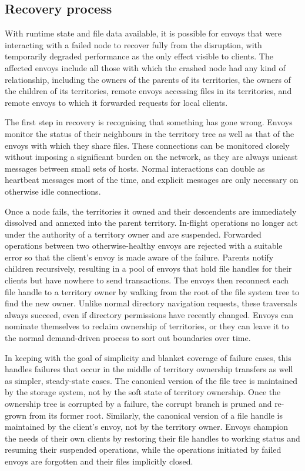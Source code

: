 \subsection{Recovery process}

With runtime state and file data available, it is possible for envoys that were interacting with a failed node to recover fully from the disruption, with temporarily degraded performance as the only effect visible to clients. The affected envoys include all those with which the crashed node had any kind of relationship, including the owners of the parents of its territories, the owners of the children of its territories, remote envoys accessing files in its territories, and remote envoys to which it forwarded requests for local clients.

The first step in recovery is recognising that something has gone wrong. Envoys monitor the status of their neighbours in the territory tree as well as that of the envoys with which they share files. These connections can be monitored closely without imposing a significant burden on the network, as they are always unicast messages between small sets of hosts. Normal interactions can double as heartbeat messages most of the time, and explicit messages are only necessary on otherwise idle connections.

Once a node fails, the territories it owned and their descendents are immediately dissolved and annexed into the parent territory. In-flight operations no longer act under the authority of a territory owner and are suspended. Forwarded operations between two otherwise-healthy envoys are rejected with a suitable error so that the client's envoy is made aware of the failure. Parents notify children recursively, resulting in a pool of envoys that hold file handles for their clients but have nowhere to send transactions. The envoys then reconnect each file handle to a territory owner by walking from the root of the file system tree to find the new owner. Unlike normal directory navigation requests, these traversals always succeed, even if directory permissions have recently changed. Envoys can nominate themselves to reclaim ownership of territories, or they can leave it to the normal demand-driven process to sort out boundaries over time.

In keeping with the goal of simplicity and blanket coverage of failure cases, this handles failures that occur in the middle of territory ownership transfers as well as simpler, steady-state cases. The canonical version of the file tree is maintained by the storage system, not by the soft state of territory ownership. Once the ownership tree is corrupted by a failure, the corrupt branch is pruned and re-grown from its former root. Similarly, the canonical version of a file handle is maintained by the client's envoy, not by the territory owner. Envoys champion the needs of their own clients by restoring their file handles to working status and resuming their suspended operations, while the operations initiated by failed envoys are forgotten and their files implicitly closed.

